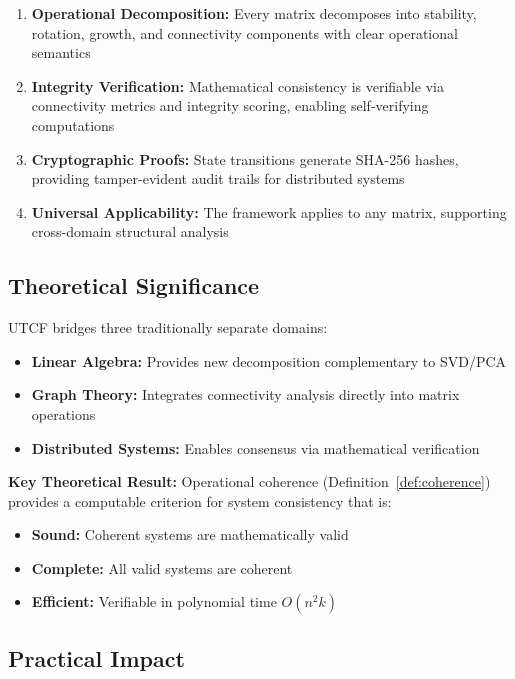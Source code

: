 \documentclass[11pt,a4paper]{article}
\theoremstyle{definition}
\theoremstyle{remark}
\begin{document}
\begin{enumerate}
\item \textbf{Operational Decomposition:} Every matrix decomposes into stability, rotation, growth, and connectivity components with clear operational semantics

\item \textbf{Integrity Verification:} Mathematical consistency is verifiable via connectivity metrics and integrity scoring, enabling self-verifying computations

\item \textbf{Cryptographic Proofs:} State transitions generate SHA-256 hashes, providing tamper-evident audit trails for distributed systems

\item \textbf{Universal Applicability:} The framework applies to any matrix, supporting cross-domain structural analysis
\end{enumerate}

\subsection{Theoretical Significance}

UTCF bridges three traditionally separate domains:

\begin{itemize}
\item \textbf{Linear Algebra:} Provides new decomposition complementary to SVD/PCA
\item \textbf{Graph Theory:} Integrates connectivity analysis directly into matrix operations
\item \textbf{Distributed Systems:} Enables consensus via mathematical verification
\end{itemize}

\textbf{Key Theoretical Result:} Operational coherence (Definition~\ref{def:coherence}) provides a computable criterion for system consistency that is:
\begin{itemize}
\item \textbf{Sound:} Coherent systems are mathematically valid
\item \textbf{Complete:} All valid systems are coherent
\item \textbf{Efficient:} Verifiable in polynomial time $O(n^2 k)$
\end{itemize}

\subsection{Practical Impact}
\end{document}
